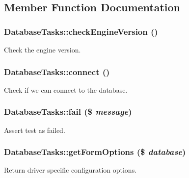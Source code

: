 \subsection{Member Function Documentation}
\hypertarget{classDatabaseTasks_a0e94441f09146aa9d6a991f7483f19d1}{
\subsubsection[{checkEngineVersion}]{\setlength{\rightskip}{0pt plus 5cm}DatabaseTasks::checkEngineVersion ()}}
\label{classDatabaseTasks_a0e94441f09146aa9d6a991f7483f19d1}
Check the engine version. \hypertarget{classDatabaseTasks_a64f74ab2f1de175c8b472223a9267ce7}{
\subsubsection[{connect}]{\setlength{\rightskip}{0pt plus 5cm}DatabaseTasks::connect ()}}
\label{classDatabaseTasks_a64f74ab2f1de175c8b472223a9267ce7}
Check if we can connect to the database. \hypertarget{classDatabaseTasks_a97dfb29bafb3aeca1eeba6caec27f203}{
\subsubsection[{fail}]{\setlength{\rightskip}{0pt plus 5cm}DatabaseTasks::fail (\$ {\em message})}}
\label{classDatabaseTasks_a97dfb29bafb3aeca1eeba6caec27f203}
Assert test as failed. \hypertarget{classDatabaseTasks_a97968c7dd7807a65a301a27ea3d15480}{
\subsubsection[{getFormOptions}]{\setlength{\rightskip}{0pt plus 5cm}DatabaseTasks::getFormOptions (\$ {\em database})}}
\label{classDatabaseTasks_a97968c7dd7807a65a301a27ea3d15480}
Return driver specific configuration options.


